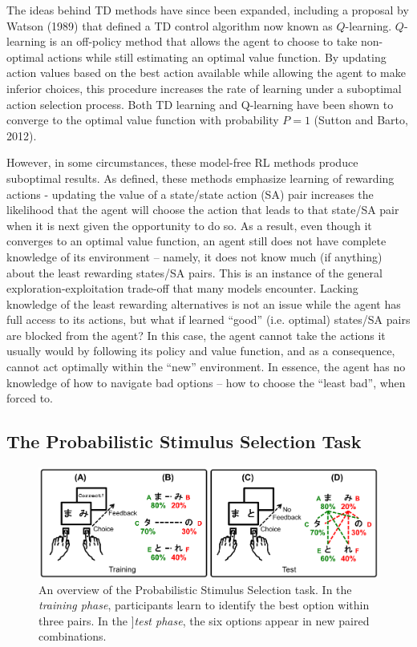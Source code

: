 \documentclass[10pt,letterpaper]{article}
\begin{document}
The ideas behind TD methods have since been expanded, including a proposal by Watson (1989) that defined a TD control algorithm now known as $Q$-learning. $Q$-learning is an off-policy method that allows the agent to choose to take non-optimal actions while still estimating an optimal value function. By updating action values based on the best action available while allowing the agent to make inferior choices, this procedure increases the rate of learning under a suboptimal action selection process. Both TD learning and Q-learning have been shown to converge to the optimal value function with probability $P = 1$ (Sutton and Barto, 2012).

However, in some circumstances, these model-free RL methods produce suboptimal results. As defined, these methods emphasize learning of rewarding actions - updating the value of a state/state action (SA) pair increases the likelihood that the agent will choose the action that leads to that state/SA pair when it is next given the opportunity to do so. As a result, even though it converges to an optimal value function, an agent still does not have complete knowledge of its environment -- namely, it does not know much (if anything) about the least rewarding states/SA pairs. This is an instance of the general exploration-exploitation trade-off that many models encounter. Lacking knowledge of the least rewarding alternatives is not an issue while the agent has full access to its actions, but what if learned ``good'' (i.e. optimal) states/SA pairs are blocked from the agent? In this case, the agent cannot take the actions it usually would by following its policy and value function, and as a consequence, cannot act optimally within the ``new'' environment. In essence, the agent has no knowledge of how to navigate bad options – how to choose the ``least bad'', when forced to.

\subsection{The Probabilistic Stimulus Selection Task}

\begin{figure}[ht]
	\begin{center}
		\includegraphics[width=6.5in]{pss.png}
	\end{center}
	\caption{An overview of the Probabilistic Stimulus Selection task. In the \emph{training phase}, participants learn to identify the best option within three pairs. In the ]\emph{test phase}, the six options appear in new paired combinations.}
	\label{pss}
\end{figure}
\end{document}
